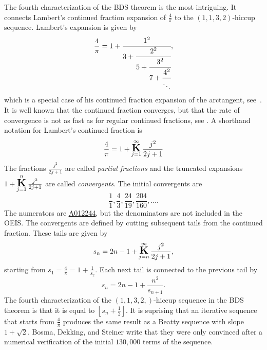 \documentclass[12pt,reqno]{article}
\newcommand{\seqnum}[1]{\href{https://oeis.org/#1}{\rm \underline{#1}}}
\begin{document}
The fourth characterization of the BDS theorem 
is the most intriguing. It connects
Lambert's continued fraction expansion
of $\frac 4{\pi}$ to the $(1,1,3,2)$-hiccup
sequence. 
Lambert's expansion is given by
\[
{\frac 4 \pi } = 
1+
\cfrac{1^2}{3 + 
\cfrac{2^2}{5 + 
\cfrac{3^2}{7 + 
\cfrac{4^2}{\ddots}}}}, 
\]
which is a special case of his continued fraction expansion
of the arctangent, see~\cite{bauer2005}. It is well known that the continued
fraction converges, but that the rate of convergence is
not as fast as for regular continued fractions, see
\cite[Table 2.3]{jonesthron}. 
A shorthand notation for Lambert's continued fraction is
\[
\frac 4 \pi =1+\mathop{\mbox{\Large\bfseries K}}\limits_{j=1}^{\infty} \frac{j^2}{2j+1}
\]
The fractions $\frac{j^2}{2j+1}$ are called \emph{partial fractions}
and the truncated expansions $1+\mathop{\mbox{\Large\bfseries K}}\limits_{j=1}^{n} \frac{j^2}{2j+1}$
are called \emph{convergents}.
The initial convergents are \[\frac 1 1, \frac 4 3, \frac {24}{19}, \frac{204}{160},\ldots.\]
The numerators are \seqnum{A012244}, but the denominators are not included in the OEIS. 
The convergents are defined by cutting subsequent tails from the continued fraction. 
These tails are given by
\[
s_{n} =2n-1+\mathop{\mbox{\Large\bfseries K}}\limits_{j=n}^{\infty} \frac{j^2}{2j+1},
\] 
starting from $s_1=\frac 4 \pi=1+\frac 1{s_2}$.
Each next tail is connected to the previous tail by
\[
s_n=2n-1+\frac {n^2}{s_{n+1}}.
\]
The fourth characterization of the $(1,1,3,2,)$-hiccup sequence 
in the BDS theorem is that it is equal to 
$\left\lfloor s_n+\frac 12\right\rfloor$. It is suprising that
an iterative sequence that starts from $\frac 4\pi$ produces
the same result as a Beatty sequence with slope $1+\sqrt 2$.
Bosma, Dekking, and Steiner write that they were only convinced
after a numerical verification of the initial $130,000$ terms
of the sequence.
\end{document}
